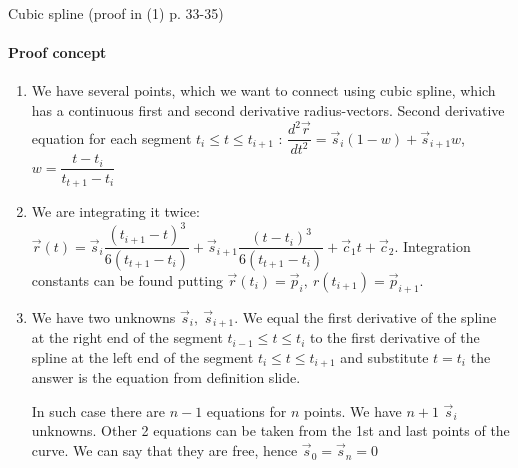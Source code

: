 \documentclass[aspectratio=169]{beamer}
\begin{document}
\begin{frame}[t]{Cubic spline (proof in (1) p. 33-35)}
    \framesubtitle{Proof concept}
    \footnotesize
    \vspace{-0.5cm}
    \begin{enumerate}
        \item We have several points, which we want to connect using cubic spline, which has a continuous first and second derivative radius-vectors. Second derivative equation for each segment $t_i \leq t \leq t_{i+1}$ : $\dfrac{d^2 \vec{r}}{d t^2} = \vec{s}_i(1-w)+\vec{s}_{i+1}w$, $w=\dfrac{t-t_i}{t_{t+1}-t_i}$ 
        \pause
        \item We are integrating it twice: $\vec{r}(t)=\vec{s}_i\dfrac{(t_{i+1}-t)^3}{6(t_{t+1}-t_i)} + \vec{s}_{i+1}\dfrac{(t-t_i)^3}{6(t_{t+1}-t_i)}+\vec{c}_1t+\vec{c}_2$. Integration constants can be found putting $\vec{r}(t_i)=\vec{p}_i,\ {r}(t_{i+1})=\vec{p}_{i+1}$.
        \pause
        \item We have two unknowns $\vec{s}_i,\ \vec{s}_{i+1}$. We equal the first derivative of the spline at the right end of the segment $t_{i-1} \leq t \leq t_{i}$ to the first derivative of the spline at the left end of the segment $t_i \leq t \leq t_{i+1}$ and substitute $t=t_i$ the answer is the equation from definition slide. \medskip

        In such case there are $n-1$ equations for $n$ points. We have $n+1$ $\vec{s}_i$ unknowns. Other 2 equations can be taken from the 1st and last points of the curve. We can say that they are free, hence $\vec{s}_0=\vec{s}_n=0 $
    \end{enumerate}
    
\end{frame}
\end{document}
